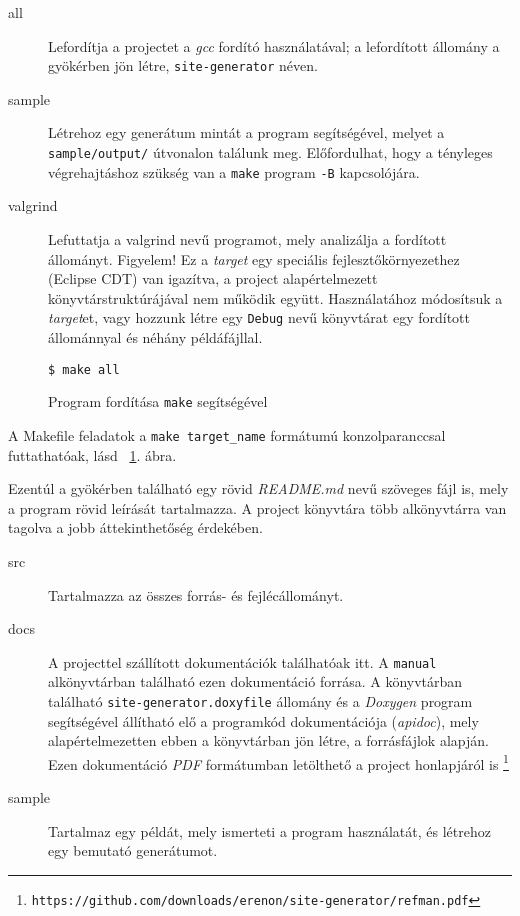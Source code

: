 \documentclass[a4paper,10pt]{article}
\begin{document}
\begin{description}
	\item[all] Lefordítja a projectet a \emph{gcc} fordító használatával; a lefordított állomány a gyökérben jön létre, \texttt{site-generator} néven.

	\item[sample] Létrehoz egy generátum mintát a program segítségével, melyet a \texttt{sample/output/} útvonalon találunk meg. Előfordulhat, hogy a tényleges végrehajtáshoz szükség van a \texttt{make} program \texttt{-B} kapcsolójára.

	\item[valgrind] Lefuttatja a valgrind nevű programot, mely analizálja a fordított állományt. Figyelem! Ez a \emph{target} egy speciális fejlesztőkörnyezethez (Eclipse CDT) van igazítva, a project alapértelmezett könyvtárstruktúrájával nem működik együtt. Használatához módosítsuk a \emph{target}et, vagy hozzunk létre egy \texttt{Debug} nevű könyvtárat egy fordított állománnyal és néhány példáfájllal.
\end{description}

\begin{figure}[h!]
		\begin{lstlisting}
$ make all
		\end{lstlisting}
		\caption{Program fordítása \texttt{make} segítségével}
		\label{fig:makeexample}
\end{figure}

A Makefile feladatok a \texttt{make target\_name} formátumú konzolparanccsal futtathatóak, lásd ~\ref{fig:makeexample}. ábra.

Ezentúl a gyökérben található egy rövid \emph{README.md} nevű szöveges fájl is, mely a program rövid leírását tartalmazza. A project könyvtára több alkönyvtárra van tagolva a jobb áttekinthetőség érdekében.

\begin{description}
	\item[src] Tartalmazza az összes forrás- és fejlécállományt.
	\item[docs] A projecttel szállított dokumentációk találhatóak itt. A \texttt{manual} alkönyvtárban található ezen dokumentáció forrása. A könyvtárban található \texttt{site-generator.doxyfile} állomány és a \emph{Doxygen} program segítségével állítható elő a programkód dokumentációja (\emph{apidoc}), mely alapértelmezetten ebben a könyvtárban jön létre, a forrásfájlok alapján. Ezen dokumentáció \emph{PDF} formátumban letölthető a project honlapjáról is \footnote{\texttt{https://github.com/downloads/erenon/site-generator/refman.pdf}}
	\item[sample] Tartalmaz egy példát, mely ismerteti a program használatát, és létrehoz egy bemutató generátumot.
\end{description}
\end{document}

